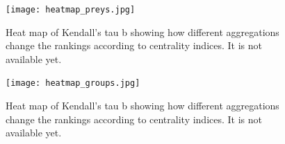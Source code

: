 \documentclass[twocolumn]{article}
\begin{document}
\begin{appendices}
		\begin{figure}[b]%
			\centering
			\texttt{[image: heatmap\_preys.jpg]}
			\caption{Heat map of Kendall's tau b showing how different aggregations change the rankings according to centrality indices. It is not available yet. } \label{fig:preys_results}
		\end{figure}

		\begin{figure}[b]%
			\centering
			\texttt{[image: heatmap\_groups.jpg]}
			\caption{Heat map of Kendall's tau b showing how different aggregations change the rankings according to centrality indices. It is not available yet. } \label{fig:groups_results}
		\end{figure}

\end{appendices}
\end{document}
